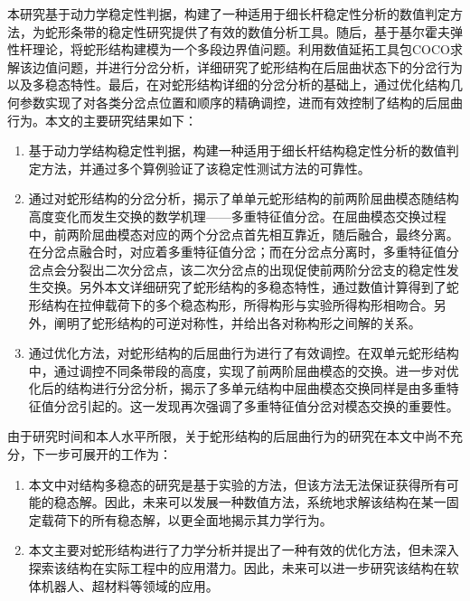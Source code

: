 
\begin{conclusion}
本研究基于动力学稳定性判据，构建了一种适用于细长杆稳定性分析的数值判定方法，为蛇形条带的稳定性研究提供了有效的数值分析工具。随后，基于基尔霍夫弹性杆理论，将蛇形结构建模为一个多段边界值问题。利用数值延拓工具包COCO求解该边值问题，并进行分岔分析，详细研究了蛇形结构在后屈曲状态下的分岔行为以及多稳态特性。最后，在对蛇形结构详细的分岔分析的基础上，通过优化结构几何参数实现了对各类分岔点位置和顺序的精确调控，进而有效控制了结构的后屈曲行为。本文的主要研究结果如下：
\begin{enumerate}
	\item 基于动力学结构稳定性判据，构建一种适用于细长杆结构稳定性分析的数值判定方法，并通过多个算例验证了该稳定性测试方法的可靠性。
	\item 通过对蛇形结构的分岔分析，揭示了单单元蛇形结构的前两阶屈曲模态随结构高度变化而发生交换的数学机理——多重特征值分岔。在屈曲模态交换过程中，前两阶屈曲模态对应的两个分岔点首先相互靠近，随后融合，最终分离。在分岔点融合时，对应着多重特征值分岔；而在分岔点分离时，多重特征值分岔点会分裂出二次分岔点，该二次分岔点的出现促使前两阶分岔支的稳定性发生交换。另外本文详细研究了蛇形结构的多稳态特性，通过数值计算得到了蛇形结构在拉伸载荷下的多个稳态构形，所得构形与实验所得构形相吻合。另外，阐明了蛇形结构的可逆对称性，并给出各对称构形之间解的关系。
	\item 通过优化方法，对蛇形结构的后屈曲行为进行了有效调控。在双单元蛇形结构中，通过调控不同条带段的高度，实现了前两阶屈曲模态的交换。进一步对优化后的结构进行分岔分析，揭示了多单元结构中屈曲模态交换同样是由多重特征值分岔引起的。这一发现再次强调了多重特征值分岔对模态交换的重要性。
\end{enumerate}

由于研究时间和本人水平所限，关于蛇形结构的后屈曲行为的研究在本文中尚不充分，下一步可展开的工作为：
\begin{enumerate}
	\item 本文中对结构多稳态的研究是基于实验的方法，但该方法无法保证获得所有可能的稳态解。因此，未来可以发展一种数值方法，系统地求解该结构在某一固定载荷下的所有稳态解，以更全面地揭示其力学行为。
	\item 本文主要对蛇形结构进行了力学分析并提出了一种有效的优化方法，但未深入探索该结构在实际工程中的应用潜力。因此，未来可以进一步研究该结构在软体机器人、超材料等领域的应用。

\end{enumerate}
\end{conclusion}

